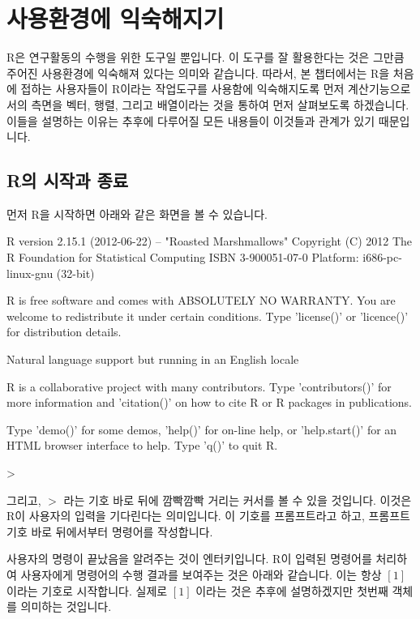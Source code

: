 \chapter{사용환경에 익숙해지기}

R은 연구활동의 수행을 위한 도구일 뿐입니다. 
이 도구를 잘 활용한다는 것은 그만큼 주어진 사용환경에 익숙해져 있다는 의미와 같습니다.
따라서, 본 챕터에서는 R을 처음에 접하는 사용자들이 R이라는 작업도구를 사용함에 익숙해지도록 먼저 계산기능으로서의 측면을 벡터, 행렬, 그리고 배열이라는 것을 통하여 먼저 살펴보도록 하겠습니다.
이들을 설명하는 이유는 추후에 다루어질 모든 내용들이 이것들과 관계가 있기 때문입니다. 


\section{R의 시작과 종료}

먼저 R을 시작하면 아래와 같은 화면을 볼 수 있습니다.

\begin{Schunk}
\begin{Soutput}
R version 2.15.1 (2012-06-22) -- "Roasted Marshmallows"
Copyright (C) 2012 The R Foundation for Statistical Computing
ISBN 3-900051-07-0
Platform: i686-pc-linux-gnu (32-bit)

R is free software and comes with ABSOLUTELY NO WARRANTY.
You are welcome to redistribute it under certain conditions.
Type 'license()' or 'licence()' for distribution details.

  Natural language support but running in an English locale

R is a collaborative project with many contributors.
Type 'contributors()' for more information and
'citation()' on how to cite R or R packages in publications.

Type 'demo()' for some demos, 'help()' for on-line help, or
'help.start()' for an HTML browser interface to help.
Type 'q()' to quit R.

> 
\end{Soutput}
\end{Schunk}

그리고, $>$ 라는 기호 바로 뒤에 깜빡깜빡 거리는 커서를 볼 수 있을 것입니다. 
이것은 R이 사용자의 입력을 기다린다는 의미입니다. 
이 기호를 프롬프트라고 하고, 프롬프트 기호 바로 뒤에서부터 명령어를 작성합니다. 

사용자의 명령이 끝났음을 알려주는 것이 엔터키입니다. 
R이 입력된 명령어를 처리하여 사용자에게 명령어의 수행 결과를 보여주는 것은 아래와 같습니다.
이는 항상 $[1]$ 이라는 기호로 시작합니다. 
실제로 $[1]$ 이라는 것은 추후에 설명하겠지만 첫번째 객체를 의미하는 것입니다.

